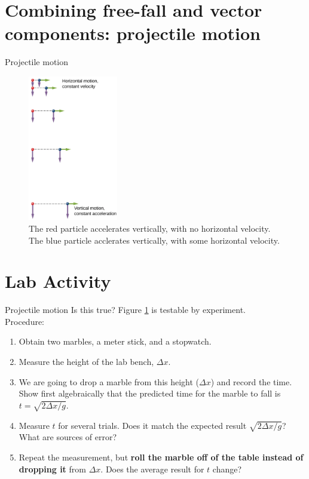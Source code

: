 \documentclass{beamer}
\begin{document}
\section{Combining free-fall and vector components: projectile motion}

\begin{frame}{Projectile motion}
\small
\begin{figure}
\centering
\includegraphics[width=0.35\textwidth]{figures/fall.png}
\caption{\label{fig:fall} The red particle accelerates vertically, with no horizontal velocity.  The blue particle acclerates vertically, with some horizontal velocity.}
\end{figure}
\end{frame}

\section{Lab Activity}

\begin{frame}{Projectile motion}
Is this true?  Figure \ref{fig:fall} is testable by experiment. \\
\vspace{0.5cm}
\small
Procedure:
\begin{enumerate}
\item Obtain two marbles, a meter stick, and a stopwatch.
\item Measure the height of the lab bench, $\Delta x$.
\item We are going to drop a marble from this height ($\Delta x$) and record the time.  Show first algebraically that the predicted time for the marble to fall is $t = \sqrt{2\Delta x/g}$.
\item Measure $t$ for several trials.  Does it match the expected result $\sqrt{2\Delta x/g}$?  What are sources of error?
\item Repeat the measurement, but \textbf{roll the marble off of the table instead of dropping it} from $\Delta x$.  Does the average result for $t$ change?
\end{enumerate}
\end{frame}
\end{document}
